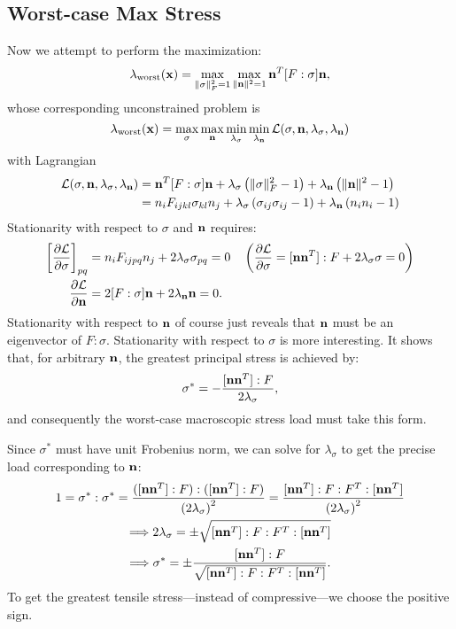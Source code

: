 \documentclass[10pt]{article}
\providecommand{\norm}[1]{\lVert#1\rVert}
\providecommand{\pder}[2]{\frac{\partial #1}{\partial #2}}
\renewcommand{\vec}[1]{{\bf #1}}
\def\n{{\bf n}}
\def\x{\vec{x}}
\def\L{\mathcal{L}}
\begin{document}
\subsection{Worst-case Max Stress}
Now we attempt to perform the maximization:
\begin{equation}
\label{eqn:worstEigenvalueForm}
\lambda_\text{worst}(\x) = \max_{\norm{\sigma}^2_F = 1} \max_{\norm{\n}^2 = 1} \n^T [F : \sigma] \n,
\end{equation}
whose corresponding unconstrained problem is
$$
\lambda_\text{worst}(\x) = \max_{\sigma} \max_{\n} \min_{\lambda_\sigma} \min_{\lambda_\n} \L(\sigma, \n, \lambda_\sigma, \lambda_\n)
$$
with Lagrangian
\begin{align*}
\L(\sigma, \n, \lambda_\sigma, \lambda_\n) &= \n^T [F : \sigma] \n + \lambda_\sigma \left(\norm{\sigma}^2_F - 1\right)  + \lambda_\n \left(\norm{\n}^2 - 1\right) \\
                                           &= n_i F_{ijkl} \sigma_{kl} n_j + \lambda_\sigma \left(\sigma_{ij}\sigma_{ij} - 1\right)  + \lambda_\n \left(n_i n_i - 1\right) 
\end{align*}
Stationarity with respect to $\sigma$ and $\n$ requires:
\begin{align}
\label{eqn:stationarySigma}
\left[\pder{\L}{\sigma}\right]_{pq} &= n_i F_{ijpq} n_j + 2 \lambda_\sigma \sigma_{pq} = 0 \quad \left(\pder{\L}{\sigma} = [\n \n^T] : F + 2 \lambda_\sigma \sigma = 0\right) \\
\label{eqn:stationaryN}
      \pder{\L}{\n} &= 2 [F : \sigma] \n + 2 \lambda_\n \n = 0.
\end{align}
Stationarity with respect to $\n$ of course just reveals that $\n$ must be an
eigenvector of $F : \sigma$. Stationarity with respect to $\sigma$ is more
interesting. It shows that, for arbitrary $\n$, the greatest principal stress is
achieved by:
$$
\sigma^* = - \frac{[\n \n^T] : F}{2 \lambda_\sigma},
$$
and consequently the worst-case macroscopic stress load must take this form.

Since $\sigma^*$ must have unit Frobenius norm, we can solve for
$\lambda_\sigma$ to get the precise load corresponding to $\n$:
\begin{gather*}
1 = \sigma^* : \sigma^*
  = \frac{([\n {\n}^T] : F) : ([\n {\n}^T] : F)}{\left(2 \lambda_\sigma\right)^2}
  = \frac{[\n {\n}^T] : F : F^T : [\n {\n}^T] }{\left(2 \lambda_\sigma\right)^2} \\
\Longrightarrow
    2 \lambda_\sigma = \pm \sqrt{[\n {\n}^T] : F : F^T : [\n {\n}^T]} \\
\Longrightarrow
    \sigma^* = \pm \frac{[\n \n^T] : F}{\sqrt{[\n {\n}^T] : F : F^T : [\n {\n}^T]}}.
\end{gather*}
To get the greatest tensile stress---instead of compressive---we choose the
positive sign.
\end{document}
